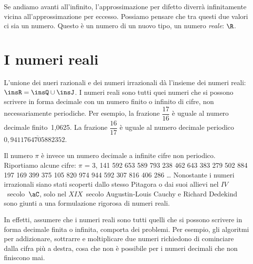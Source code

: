 Se andiamo avanti all'infinito, l'approssimazione per difetto diverrà 
infinitamente vicina all'approssimazione per eccesso. 
Possiamo pensare che tra questi due valori ci sia un numero. Questo è un 
numero di un nuovo tipo, un numero \emph{reale}: \(\R\).

\section{I numeri reali}
\label{sec:radicali_reali}

L'unione dei nueri razionali e dei numeri irrazionali dà l'insieme dei 
numeri reali: $\insR=\insQ \cup \insJ$.
I numeri reali sono tutti quei numeri che si possono scrivere in forma 
decimale con un numero finito o infinito di cifre, non necessariamente 
periodiche.
Per esempio, la frazione $\dfrac{17}{16}$ è uguale al numero decimale 
finito~1,0625.
La frazione $\dfrac{16}{17}$ è uguale al numero decimale periodico 
$0,\overline{9411764705882352}$.

Il numero $\pi$ è invece un numero decimale a infinite cifre non periodico. 
Riportiamo alcune cifre:
$\pi $ = 3, 141 592 653 589 793 238 462 643 383 279 502 884 197 169 399 375 
105 820 974 944 592 307 816 406 286
\ldots 
Nonostante i numeri irrazionali siano stati scoperti dallo stesso Pitagora o 
dai suoi allievi nel $IV$~secolo~$\aC$, solo nel $XIX$~secolo Augustin-Louis 
Cauchy e Richard Dedekind sono giunti a una formulazione rigorosa di numeri 
reali.

In effetti, assumere che i numeri reali sono tutti quelli che si possono 
scrivere in forma decimale finita o infinita,  comporta dei problemi. 
Per esempio, gli algoritmi per addizionare, 
sottrarre e moltiplicare due numeri richiedono di cominciare dalla cifra 
più a destra, cosa che non è possibile per i numeri decimali che non 
finiscono mai. 

